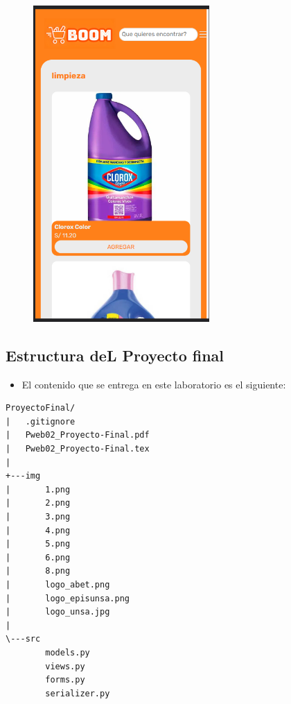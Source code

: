 \documentclass{article}
\begin{document}
	\begin{figure}[H]
		\centering
		\includegraphics[width=0.6\textwidth,keepaspectratio]{img/9.png}
	\end{figure}

	

	\subsection{Estructura deL Proyecto final}
	\begin{itemize}	
		\item El contenido que se entrega en este laboratorio es el siguiente:
	\end{itemize}

\begin{lstlisting}[style=ascii-tree]
ProyectoFinal/
|   .gitignore
|   Pweb02_Proyecto-Final.pdf
|   Pweb02_Proyecto-Final.tex
|
+---img
|       1.png
|       2.png
|       3.png
|       4.png
|       5.png
|       6.png
|       8.png
|       logo_abet.png
|       logo_episunsa.png
|       logo_unsa.jpg
|
\---src
        models.py
        views.py
        forms.py
        serializer.py
\end{lstlisting}    
\end{document}

